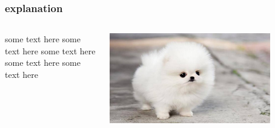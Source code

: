\documentclass[14pt]{beamer}
\begin{document}
\begin{frame}
  \frametitle{explanation}
  \begin{columns}
  \begin{column}{0.5\textwidth}
     some text here some text here some text here some text here some text here
  \end{column}
  \begin{column}{0.5\textwidth}  %
      \begin{center}
       \includegraphics[width=0.8\textwidth]{kuza.jpg}
       \end{center}
  \end{column}
  \end{columns}
\end{frame}



%
\end{document}

